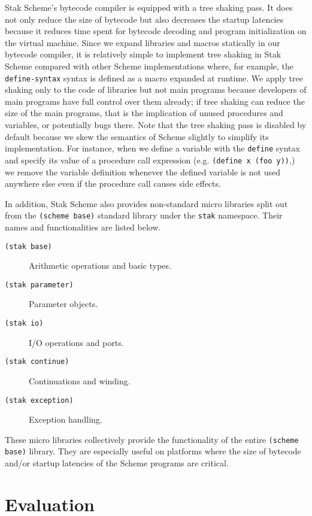 \documentclass[sigplan]{acmart}
\begin{document}
Stak Scheme's bytecode compiler is equipped with a tree shaking pass.
It does not only reduce the size of bytecode but also
decreases the startup latencies because it reduces time spent for bytecode
decoding and program initialization on the virtual machine.
Since we expand libraries and macros statically
in our bytecode compiler, it is relatively simple to
implement tree shaking in Stak Scheme compared with other Scheme
implementations where, for example, the
\texttt{define-syntax} syntax is defined as a macro expanded at runtime.
We apply tree shaking only to the code of libraries but not main
programs because developers of main programs have full control over
them already; if tree shaking can reduce the size of the main programs,
that is the implication of unused procedures and variables, or
potentially bugs there.
Note that the tree shaking pass is disabled by default because we skew the
semantics of Scheme slightly to simplify its implementation.
For instance, when we define a variable with the \texttt{define} syntax and
specify its value of a procedure call expression
(e.g. \texttt{(define x (foo y))},) we remove the variable definition
whenever the defined variable is not used anywhere else even if the
procedure call causes side effects.

In addition, Stak Scheme also provides non-standard micro libraries
split out from the \texttt{(scheme base)} standard library under
the \texttt{stak} namespace.
Their names and functionalities are listed below.

\begin{description}
  \item[\texttt{(stak base)}] Arithmetic operations and basic types.
  \item[\texttt{(stak parameter)}] Parameter objects.
  \item[\texttt{(stak io)}] I/O operations and ports.
  \item[\texttt{(stak continue)}] Continuations and winding.
  \item[\texttt{(stak exception)}] Exception handling.
\end{description}

These micro libraries collectively provide the functionality of the entire
\texttt{(scheme base)} library.
They are especially useful on platforms where the size of bytecode
and/or startup latencies of the Scheme programs are critical.

\section{Evaluation} \label{evaluation}
\end{document}

